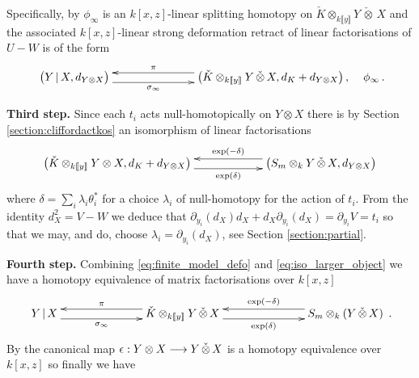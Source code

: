 \documentclass[english,letter paper,12pt,leqno]{article}
\theoremstyle{example}
\numberwithin{equation}{section}
\begin{document}
Specifically, by \cite[Proposition 7.1]{dm1102.2957} $\phi_\infty$ is an $k[x,z]$-linear splitting homotopy on $\check{K} \otimes_{k\llbracket y \rrbracket} Y \,\check{\otimes}\, X$ and the associated $k[x,z]$-linear strong deformation retract of linear factorisations of $U - W$ is of the form
\begin{equation}\label{eq:finite_model_defo}
\xymatrix@C+4pc{
\big( Y \l X, d_{Y \otimes X} \big) \ar@<-1ex>[r]_-{\sigma_\infty} & \big( \check{K} \otimes_{k\llbracket y \rrbracket} Y \,\check{\otimes}\, X, d_K + d_{Y \otimes X} \big)\,, \ar@<-1ex>[l]_-{\pi}
} \quad \phi_\infty\,.
\end{equation}

\textbf{Third step.} Since each $t_i$ acts null-homotopically on $Y \otimes X$ there is by Section \ref{section:cliffordactkos} an isomorphism of linear factorisations
\begin{equation}\label{eq:iso_larger_object}
\xymatrix@C+3pc{ \big( \check{K} \otimes_{k\llbracket y \rrbracket} Y \otimes X, d_K + d_{Y \otimes X} \big) \ar@<-1ex>[r]_-{ \exp(\delta) } & \big( S_m \otimes_k Y \,\check{\otimes}\, X, d_{Y \otimes X} \big)\ar@<-1ex>[l]_-{ \exp(-\delta) } }
\end{equation}
where $\delta = \sum_i \lambda_i \theta_i^*$ for a choice $\lambda_i$ of null-homotopy for the action of $t_i$. From the identity $d^2_X = V - W$ we deduce that $\partial_{y_i}(d_X) d_X + d_X \partial_{y_i}(d_X) = \partial_{y_i} V = t_i$ so that we may, and do, choose $\lambda_i = \partial_{y_i}(d_X)$, see Section \ref{section:partial}.

\vspace{0.3cm}

\textbf{Fourth step.} Combining \eqref{eq:finite_model_defo} and \eqref{eq:iso_larger_object} we have a homotopy equivalence of matrix factorisations over $k[x,z]$
\begin{equation}\label{eq:final_finite_model2}
\xymatrix@C+4pc{
Y \l X \ar@<-1ex>[r]_-{\sigma_\infty} & \check{K} \otimes_{k\llbracket y \rrbracket} Y \,\check{\otimes}\, X \ar@<-1ex>[l]_-{\pi} \ar@<-1ex>[r]_-{ \exp(\delta) } & S_m \otimes_k ( Y \,\check{\otimes}\, X ) \ar@<-1ex>[l]_-{ \exp(-\delta) }
}\,.
\end{equation}
By \cite[Remark 7.7]{dm1102.2957} the canonical map $\epsilon: Y \otimes X \longrightarrow Y \,\check{\otimes}\, X$ is a homotopy equivalence over $k[x,z]$ so finally we have
\end{document}
